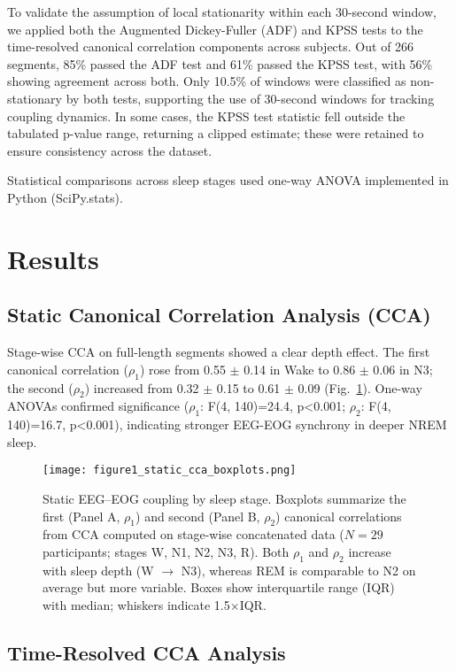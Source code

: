 To validate the assumption of local stationarity within each 30-second window, we applied both the Augmented Dickey-Fuller (ADF) and KPSS tests to the time-resolved canonical correlation components across subjects. Out of 266 segments, 85\% passed the ADF test and 61\% passed the KPSS test, with 56\% showing agreement across both. Only 10.5\% of windows were classified as non-stationary by both tests, supporting the use of 30-second windows for tracking coupling dynamics. In some cases, the KPSS test statistic fell outside the tabulated p-value range, returning a clipped estimate; these were retained to ensure consistency across the dataset.

Statistical comparisons across sleep stages used one-way ANOVA implemented in Python (SciPy.stats).

\section{Results}

\subsection{Static Canonical Correlation Analysis (CCA)}

Stage-wise CCA on full-length segments showed a clear depth effect. The first canonical correlation ($\rho_1$) rose from 0.55 $\pm$ 0.14 in Wake to 0.86 $\pm$ 0.06 in N3; the second ($\rho_2$) increased from 0.32 $\pm$ 0.15 to 0.61 $\pm$ 0.09 (Fig.~\ref{fig:figure1}). One-way ANOVAs confirmed significance ($\rho_1$: F(4, 140)=24.4, p<0.001; $\rho_2$: F(4, 140)=16.7, p<0.001), indicating stronger EEG-EOG synchrony in deeper NREM sleep.%
%
\begin{figure}[!t]
\centering
\texttt{[image: figure1\_static\_cca\_boxplots.png]}%
\caption{Static EEG--EOG coupling by sleep stage. Boxplots summarize the first (Panel A, $\rho_1$) and second (Panel B, $\rho_2$) canonical correlations from CCA computed on stage-wise concatenated data ($N=29$ participants; stages W, N1, N2, N3, R). Both $\rho_1$ and $\rho_2$ increase with sleep depth (W $\rightarrow$ N3), whereas REM is comparable to N2 on average but more variable. Boxes show interquartile range (IQR) with median; whiskers indicate 1.5$\times$IQR.}\label{fig:figure1}
\end{figure}%

\subsection{Time-Resolved CCA Analysis}

